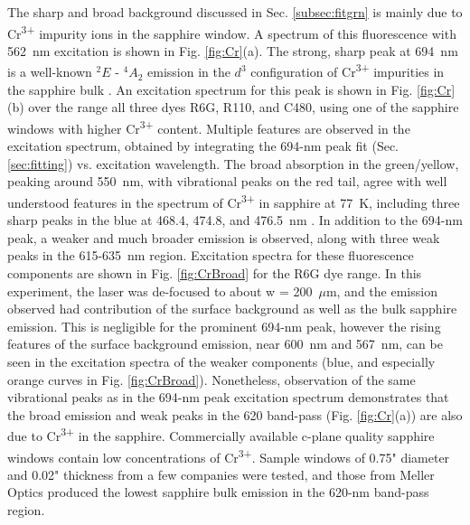 The sharp and broad background discussed in Sec. \ref{subsec:fitgrn} is mainly due to Cr\textsuperscript{3+} impurity ions in the sapphire window.  A spectrum of this fluorescence with 562~nm excitation is shown in Fig. \ref{fig:Cr}(a).  The strong, sharp peak at 694~nm is a well-known $^{2}E$ - $^{4}A_{2}$ emission in the $d^{3}$ configuration of Cr\textsuperscript{3+} impurities in the sapphire bulk \cite{SapphireRlines1964,SapphireRlines2010}.  An excitation spectrum for this peak is shown in Fig. \ref{fig:Cr}(b) over the range all three dyes R6G, R110, and C480, using one of the sapphire windows with higher Cr\textsuperscript{3+} content.  Multiple features are observed in the excitation spectrum, obtained by integrating the 694-nm peak fit (Sec. \ref{sec:fitting}) vs. excitation wavelength.  The broad absorption in the green/yellow, peaking around 550~nm, with vibrational peaks on the red tail, agree with well understood features in the spectrum of Cr\textsuperscript{3+} in sapphire at 77~K, including three sharp peaks in the blue at 468.4, 474.8, and 476.5~nm \cite{SapphireFord,SapphireMcclure}.  In addition to the 694-nm peak, a weaker and much broader emission is observed, along with three weak peaks in the 615-635~nm region.  Excitation spectra for these fluorescence components are shown in Fig. \ref{fig:CrBroad} for the R6G dye range.  In this experiment, the laser was de-focused to about w = 200~$\mu$m, and the emission observed had contribution of the surface background as well as the bulk sapphire emission.  This is negligible for the prominent 694-nm peak, however the rising features of the surface background emission, near 600~nm and 567~nm, can be seen in the excitation spectra of the weaker components (blue, and especially orange curves in Fig. \ref{fig:CrBroad}).  Nonetheless, observation of the same vibrational peaks as in the 694-nm peak excitation spectrum demonstrates that the broad emission and weak peaks in the 620 band-pass (Fig. \ref{fig:Cr}(a)) are also due to Cr\textsuperscript{3+} in the sapphire.  Commercially available c-plane quality sapphire windows contain low concentrations of Cr\textsuperscript{3+}.  Sample windows of 0.75" diameter and 0.02" thickness from a few companies were tested, and those from Meller Optics produced the lowest sapphire bulk emission in the 620-nm band-pass region.

